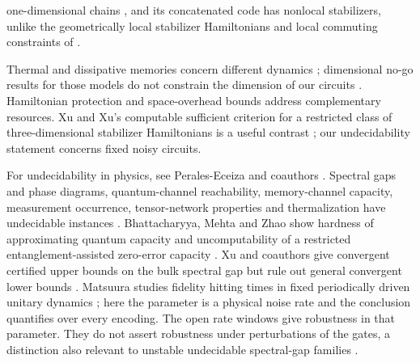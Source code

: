 one-dimensional chains \cite{Bardet2023,BC2025,CD2026}, and its concatenated code has nonlocal stabilizers, unlike the geometrically local stabilizer Hamiltonians and local commuting constraints of \cite{BravyiTerhal2009,BPT2010}.

Thermal and dissipative memories concern different dynamics \cite{Alicki2010,BDLin2026,KumarWeimer2026,PCC2011}; dimensional no-go results for those models do not constrain the dimension of our circuits \cite{BravyiTerhal2009,Brown2016,Terhal2015}. Hamiltonian protection \cite{PKSC2009} and space-overhead bounds \cite{FMSh2022} address complementary resources. Xu and Xu's computable sufficient criterion for a restricted class of three-dimensional stabilizer Hamiltonians is a useful contrast \cite{XuXu2026}; our undecidability statement concerns fixed noisy circuits.

For undecidability in physics, see Perales-Eceiza and coauthors \cite{UndecidabilityReview2025}. Spectral gaps and phase diagrams, quantum-channel reachability, memory-channel capacity, measurement occurrence, tensor-network properties and thermalization have undecidable instances \cite{BCW1D2020,BCW2021,CPGW2015,CPGW2022,DeLasCuevas2016,EMG2012,Elkouss2018,KGE2014,PLC2024,ShiraishiMatsumoto2021,WCPG2011}. Bhattacharyya, Mehta and Zhao show hardness of approximating quantum capacity and uncomputability of a restricted entanglement-assisted zero-error capacity \cite{BMZ2026}. Xu and coauthors give convergent certified upper bounds on the bulk spectral gap but rule out general convergent lower bounds \cite{XuEtAl2026}. Matsuura studies fidelity hitting times in fixed periodically driven unitary dynamics \cite{Matsuura2026}; here the parameter is a physical noise rate and the conclusion quantifies over every encoding. The open rate windows give robustness in that parameter. They do not assert robustness under perturbations of the gates, a distinction also relevant to unstable undecidable spectral-gap families \cite{CastillaLucia2026,XuEtAl2026}.


